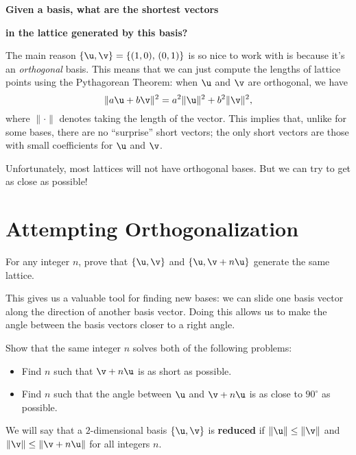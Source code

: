 \vspace{-10pt}
\begin{center}
	\textbf{Given a basis, what are the shortest vectors}
	
	\textbf{in the lattice generated by this basis?}
\end{center}

The main reason $\{\u,\v\}=\{(1,0),\,(0,1)\}$ is so nice to work with is because it's an \emph{orthogonal} basis. This means that we can just compute the lengths of lattice points using the Pythagorean Theorem: when $\u$ and $\v$ are orthogonal, we have
\[\|a\u+b\v\|^2=a^2\|\u\|^2+b^2\|\v\|^2,\]
where $\|\cdot\|$ denotes taking the length of the vector. This implies that, unlike for some bases, there are no ``surprise'' short vectors; the only short vectors are those with small coefficients for $\u$ and $\v$.

Unfortunately, most lattices will not have orthogonal bases. But we can try to get as close as possible!

\section*{Attempting Orthogonalization}

\begin{explor}
	For any integer $n$, prove that $\{\u,\v\}$ and $\{\u,\v+n\u\}$ generate the same lattice.
\end{explor}

This gives us a valuable tool for finding new bases: we can slide one basis vector along the direction of another basis vector. Doing this allows us to make the angle between the basis vectors closer to a right angle.

\begin{explor}\label{exp:samen}
	Show that the same integer $n$ solves both of the following problems:
	\begin{itemize}
		\item Find $n$ such that $\v+n\u$ is as short as possible.
		\item Find $n$ such that the angle between $\u$ and $\v+n\u$ is as close to $90^\circ$ as possible.
	\end{itemize}
\end{explor}


\begin{defn}
	We will say that a $2$-dimensional basis $\{\u,\v\}$ is \textbf{reduced} if $\|\u\|\leq\|\v\|$ and\\ $\|\v\|\leq\|\v+n\u\|$ for all integers $n$.
\end{defn}


